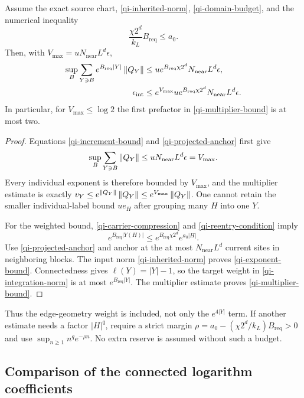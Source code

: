 \begin{proposition}
\label{qi-reentry-proposition}
Assume the exact source chart, \eqref{qi-inherited-norm},
\eqref{qi-domain-budget}, and the numerical inequality
\begin{equation}\label{qi-reentry-condition}
 \frac{\chi2^d}{k_L}B_{\mathrm{req}}\le a_0.
\end{equation}
Then, with
$V_{\max}=u N_{\mathrm{near}}L^d\epsilon$,
\begin{align}
 \sup_B\sum_{Y\ni B}e^{B_{\mathrm{req}}|Y|}\left\|Q_Y\right\|
 &\le u e^{B_{\mathrm{req}}\chi2^d}
                       N_{\mathrm{near}}L^d\epsilon,              \label{qi-exponent-bound}\\
 \epsilon_{\mathrm{int}}
 &\le e^{V_{\max}}u e^{B_{\mathrm{req}}\chi2^d}
                       N_{\mathrm{near}}L^d\epsilon.              \label{qi-multiplier-bound}
\end{align}
In particular, for $V_{\max}\le\log2$ the first prefactor
in \eqref{qi-multiplier-bound} is at most two.
\end{proposition}
\begin{proof}
Equations \eqref{qi-increment-bound} and
\eqref{qi-projected-anchor} first give
\[
 \sup_B\sum_{Y\ni B}\left\|Q_Y\right\|
       \le u N_{\mathrm{near}}L^d\epsilon=V_{\max}.
\]
Every individual exponent is therefore bounded by $V_{\max}$,
and the multiplier estimate is exactly
$v_Y\le e^{\left\|Q_Y\right\|}\left\|Q_Y\right\|\le e^{V_{\max}}\left\|Q_Y\right\|$.
One cannot retain the smaller individual-label bound $u e_H$
after grouping many $H$ into one $Y$.

For the weighted bound, \eqref{qi-carrier-compression} and
\eqref{qi-reentry-condition} imply
\[
 e^{B_{\mathrm{req}}|Y(H)|}
       \le e^{B_{\mathrm{req}}\chi2^d}e^{a_0|H|}.
\]
Use \eqref{qi-projected-anchor} and anchor at the at most
$N_{\mathrm{near}}L^d$ current sites in neighboring blocks.
The input norm \eqref{qi-inherited-norm} proves
\eqref{qi-exponent-bound}. Connectedness gives
$\ell(Y)=|Y|-1$, so the target weight in
\eqref{qi-integration-norm} is at most
$e^{B_{\mathrm{req}}|Y|}$. The multiplier estimate proves
\eqref{qi-multiplier-bound}.
\end{proof}
Thus the edge-geometry weight is included, not only the
$e^{4|Y|}$ term. If another estimate needs a factor $|H|^q$,
require a strict margin
$\rho=a_0-(\chi2^d/k_L)B_{\mathrm{req}}>0$ and use
$\sup_{n\ge1}n^q e^{-\rho n}$. No extra reserve is assumed
without such a budget.

\subsection{Comparison of the connected logarithm coefficients}

